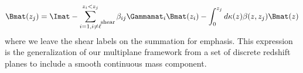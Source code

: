 \begin{equation}
\Bmat(z_j) = \Imat - \sum\limits_{i = 1, i \neq \ell}^{z_i < z_j}\mathop{}_{\mkern-5mu \rm{shear}} \beta_{ij} \Gammamat_i \Bmat(z_i) \\
- \int_0^{z_j} d\kappa(z) \beta(z, z_j) \Bmat(z)
\end{equation}
where we leave the shear labels on the summation for emphasis. This expression is the generalization of our multiplane framework from a set of discrete redshift planes to include a smooth continuous mass component.